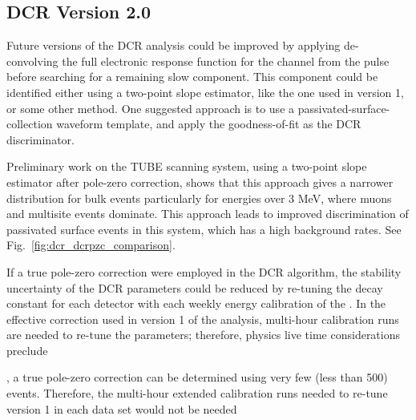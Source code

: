 \subsection{DCR Version 2.0}
Future versions of the DCR analysis could be improved by applying de-convolving the full electronic response function for the channel from the pulse before searching for a remaining slow component. This component could be identified either using a two-point slope estimator, like the one used in version 1, or some other method. One suggested approach is to use a passivated-surface-collection waveform template, and apply the goodness-of-fit as the DCR discriminator. 

Preliminary work on the TUBE scanning system, using a two-point slope estimator after pole-zero correction, shows that this approach gives a narrower distribution for bulk events particularly for energies over 3 MeV, where muons and multisite events dominate. This approach leads to improved discrimination of passivated surface events in this system, which has a high background rates. See Fig.~\ref{fig:dcr_dcrpzc_comparison}.

If a true pole-zero correction were employed in the DCR algorithm, the stability uncertainty of the DCR parameters could be reduced by re-tuning the decay constant for each detector with each weekly energy calibration of the \DEM. In the effective correction used in version 1 of the analysis, multi-hour calibration runs are needed to re-tune the parameters; therefore, physics live time considerations preclude 


, a true pole-zero correction can be determined using very few (less than 500) events. 
Therefore, the multi-hour extended calibration runs needed to re-tune version 1 in each data set would not be needed 
%

